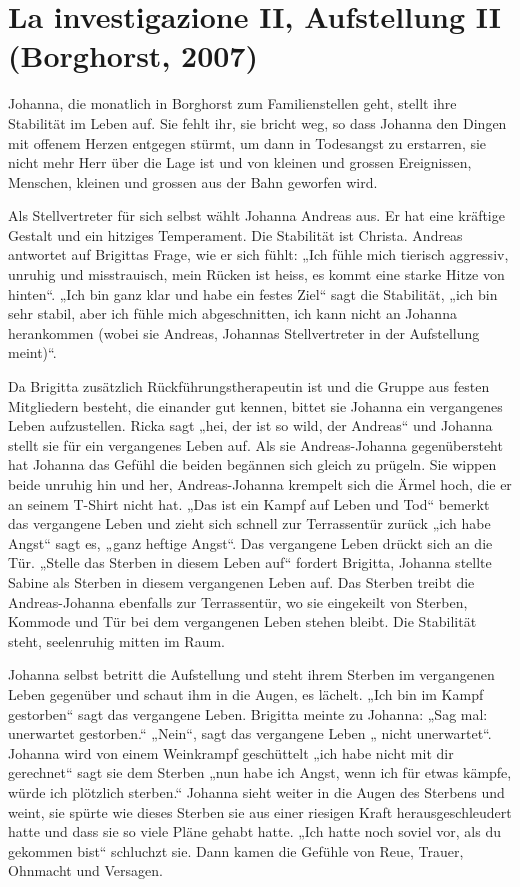 \documentclass[10pt,titlepage,a5paper]{book}
\begin{document}
\section*{La investigazione II, Aufstellung II (Borghorst, 2007)}



Johanna, die monatlich in Borghorst zum Familienstellen geht, stellt ihre Stabilität im Leben auf. Sie fehlt ihr, sie bricht weg, so dass Johanna den Dingen mit offenem Herzen entgegen stürmt, um dann in Todesangst zu erstarren, sie nicht mehr Herr über die Lage ist und von kleinen und grossen Ereignissen, Menschen, kleinen und grossen aus der Bahn geworfen wird.

Als Stellvertreter für sich selbst wählt Johanna Andreas aus. Er hat eine kräftige Gestalt und ein hitziges Temperament. Die Stabilität ist Christa. Andreas antwortet auf Brigittas Frage, wie er sich fühlt: „Ich fühle mich tierisch aggressiv, unruhig und misstrauisch, mein Rücken ist heiss, es kommt eine starke Hitze von hinten“. „Ich bin ganz klar und habe ein festes Ziel“ sagt die Stabilität, „ich bin sehr stabil, aber ich fühle mich abgeschnitten, ich kann nicht an Johanna herankommen (wobei sie Andreas, Johannas Stellvertreter in der Aufstellung meint)“.

Da Brigitta zusätzlich Rückführungstherapeutin ist und die Gruppe aus festen Mitgliedern besteht, die einander gut kennen, bittet sie Johanna ein vergangenes Leben aufzustellen. Ricka sagt „hei, der ist so wild, der Andreas“ und Johanna stellt sie für ein vergangenes Leben auf. Als sie Andreas-Johanna gegenübersteht hat Johanna das Gefühl die beiden begännen sich gleich zu prügeln. Sie wippen beide unruhig hin und her, Andreas-Johanna krempelt sich die Ärmel hoch, die er an seinem T-Shirt nicht hat. „Das ist ein Kampf auf Leben und Tod“ bemerkt das vergangene Leben und zieht sich schnell zur Terrassentür zurück „ich habe Angst“ sagt es, „ganz heftige Angst“. Das vergangene Leben drückt sich an die Tür. „Stelle das Sterben in diesem Leben auf“ fordert Brigitta, Johanna stellte Sabine als Sterben in diesem vergangenen Leben auf. Das Sterben treibt die Andreas-Johanna ebenfalls zur Terrassentür, wo sie eingekeilt von Sterben, Kommode und Tür bei dem vergangenen Leben stehen bleibt. Die Stabilität steht, seelenruhig mitten im Raum.

Johanna selbst betritt die Aufstellung und steht ihrem Sterben im vergangenen Leben gegenüber und schaut ihm in die Augen, es lächelt. „Ich bin im Kampf gestorben“ sagt das vergangene Leben. Brigitta meinte zu Johanna: „Sag mal: unerwartet gestorben.“ „Nein“, sagt das vergangene Leben „ nicht unerwartet“. Johanna wird von einem Weinkrampf geschüttelt „ich habe nicht mit dir gerechnet“ sagt   sie dem Sterben „nun habe ich Angst, wenn ich für etwas kämpfe, würde ich plötzlich sterben.“ Johanna sieht weiter in die Augen des Sterbens und weint, sie spürte wie dieses Sterben sie aus einer riesigen Kraft herausgeschleudert hatte und dass sie so viele Pläne gehabt hatte. „Ich hatte noch soviel vor, als du gekommen bist“ schluchzt sie. Dann kamen die Gefühle von Reue, Trauer, Ohnmacht und Versagen.
\end{document}
